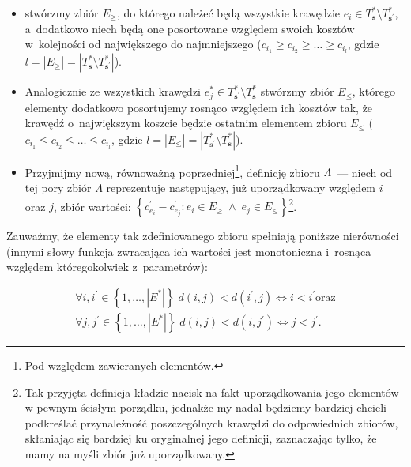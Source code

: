 \begin{itemize}
	\item stwórzmy zbiór $E_{\geqslant}$, do którego należeć będą wszystkie krawędzie $e_{i} \in T^{\ast}_{\textbf{s}} \setminus T^{\ast}_{\textbf{s}^{\prime}}$, a~dodatkowo niech będą one posortowane względem swoich kosztów w~kolejności od największego do najmniejszego ($c_{i_{1}} \geqslant c_{i_{2}} \geqslant \dots \geqslant c_{i_{l}}$, gdzie $l = \left| E_{\geqslant} \right| = \left| T^{\ast}_{\textbf{s}} \setminus T^{\ast}_{\textbf{s}^{\prime}} \right|$).
	\item Analogicznie ze wszystkich krawędzi $e^{\ast}_{j} \in T^{\ast}_{\textbf{s}^{\prime}} \setminus  T^{\ast}_{\textbf{s}}$ stwórzmy zbiór $E_{\leqslant}$, którego elementy dodatkowo posortujemy rosnąco względem ich kosztów tak, że krawędź o~największym koszcie będzie ostatnim elementem zbioru $E_{\leqslant}$ ($c_{i_{1}} \leqslant c_{i_{2}} \leqslant \dots \leqslant c_{i_{l}}$, gdzie $l = \left| E_{\leqslant} \right| = \left| T^{\ast}_{\textbf{s}^{\prime}} \setminus  T^{\ast}_{\textbf{s}} \right|$).
	\item Przyjmijmy nową, równoważną poprzedniej\footnote{
		Pod względem zawieranych elementów.
	}, definicję zbioru $\Lambda$~--- niech od tej pory zbiór $\Lambda$ reprezentuje następujący, już uporządkowany względem $i$ oraz $j$, zbiór wartości: $\left\{ c^{\prime}_{e_{i}} - c^{\prime}_{e_{j}} : e_{i} \in E_{\geqslant} \; \wedge \; e_{j} \in E_{\leqslant} \right\}$\footnote{
		Tak przyjęta definicja kładzie nacisk na fakt uporządkowania jego elementów w pewnym ścisłym porządku, jednakże my nadal będziemy bardziej chcieli podkreślać przynależność poszczególnych krawędzi do odpowiednich zbiorów, skłaniając się bardziej ku oryginalnej jego definicji, zaznaczając tylko, że mamy na myśli zbiór już uporządkowany.
	}.
\end{itemize}

Zauważmy, że elementy tak zdefiniowanego zbioru spełniają poniższe nierówności (innymi słowy funkcja zwracająca ich wartości jest monotoniczna i~rosnąca względem któregokolwiek z~parametrów):

\begin{gather}\label{eq:ddiffvalues}
	\forall i, i^{\prime} \in \left\{ 1, \dots, \left| E^{\ast} \right| \right\} \; d \left( i, j \right) < d \left( i^{\prime}, j \right) \Leftrightarrow i < i^{\prime}\text{oraz}\\
	\forall j, j^{\prime} \in \left\{ 1, \dots, \left| E^{\ast} \right| \right\} \; d \left( i, j \right) < d \left( i, j^{\prime} \right) \Leftrightarrow j < j^{\prime}\text{.}
\end{gather}

